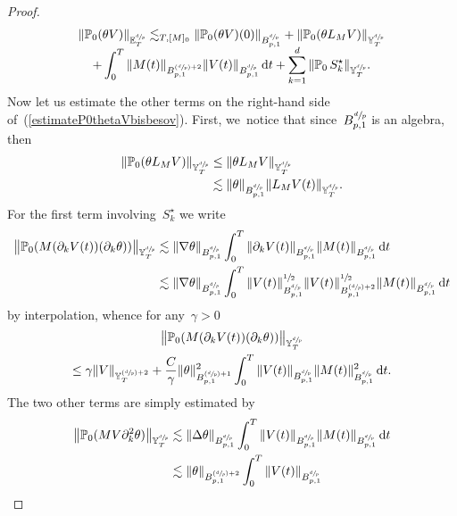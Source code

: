 \documentclass[10pt]{amsart}
\newcommand{\Psfrac}[2]{(\sfrac{#1}{#2})}
\theoremstyle{definition}
\newcommand\dd{\mathrm{d}}
\begin{document}
\begin{proof}
\begin{multline}\label{estimateP0thetaVbisbesov}
\|\mathbb{P}_0(\theta V)\|_{{\mathbb E}^{\sfrac dp}_T} \lesssim_{T,[M]_0} \|\mathbb{P}_0(\theta V)(0)\|_{B^{\sfrac dp}_{p,1}}
+ \| \mathbb{P}_0(\theta L_{M }V)\|_{{\mathbb Y}^{\sfrac dp}_T} \\[-5pt]
+ \int_0^T
\| M(t)\|_{ B^{\Psfrac dp+2}_{p,1}} \|V(t)\|_{ B^{\sfrac dp}_{p,1}}\, \dd t+ \sum_{k=1}^d \|\mathbb{P}_0\,S_k^\star\|_{{\mathbb Y}^{\sfrac dp}_T}.
\end{multline}
Now let us estimate the other terms on the right-hand side of~(\ref{estimateP0thetaVbisbesov}). First, we~notice that since~$B^{\sfrac dp}_{p,1}$ is an algebra, then
\[
\begin{aligned}
\| \mathbb{P}_0(\theta L_{M }V)\| _{{\mathbb Y}^{\sfrac dp}_T} & \leq \| \theta L_{M }V\| _{{\mathbb Y}^{\sfrac dp}_T} \\
&\lesssim \|\theta \|_{ B^{\sfrac dp}_{p,1}} \| L_{M }V(t) \| _{{\mathbb Y}^{\sfrac dp}_T}.
\end{aligned}
\]
For the first term involving~$S^\star_k$ we write
\[
\begin{aligned}
\big \| \mathbb{P}_0(M (\partial_k V(t))(\partial_k\theta)) \big\|_{ {\mathbb Y}^{\sfrac dp}_T } & \lesssim \|\nabla \theta\|_{ B^{\sfrac dp}_{p,1} } \int_0^T \| \partial_k V(t)\|_{B^{\sfrac dp}_{p,1}}
\|M(t)\| _{ B^{\sfrac dp}_{p,1}} \, \dd t \\
& \lesssim \|\nabla \theta\|_{ B^{\sfrac dp}_{p,1} } \int_0^T \| V(t)\|_{B^{\sfrac dp}_{p,1}}^{\sfrac12} \| V(t)\|_{B^{\Psfrac dp+2}_{p,1}}^{\sfrac12}
\|M(t)\| _{ B^{\sfrac dp}_{p,1}} \, \dd t
\end{aligned}
\]
by interpolation, whence for any~$
\gamma>0$
\begin{multline*}
\big \| \mathbb{P}_0(M (\partial_k V(t))(\partial_k\theta)) \big\|_{ {\mathbb Y}^{\sfrac dp}_T }\\
\leq \gamma \| V\|_{{\mathbb Y}^{\Psfrac dp+2}_T} + \frac C\gamma \| \theta\|^2_{ B^{\Psfrac dp+1}_{p,1} } \int_0^T \| V(t)\|_{B^{\sfrac dp}_{p,1}}\|M(t)\|^2 _{ B^{\sfrac dp}_{p,1}} \, \dd t.
\end{multline*}
The two other terms are simply estimated by
\[
\begin{aligned}
\big \| \mathbb{P}_0(MV \partial_k^2 \theta) \big\|_{{\mathbb Y}^{\sfrac dp}_T } & \lesssim \|\Delta \theta\|_{ B^{\sfrac dp}_{p,1} } \int_0^T \| V(t)\|_{B^{\sfrac dp}_{p,1}}
\|M(t)\| _{ B^{\sfrac dp}_{p,1}} \, \dd t \\
& \lesssim \| \theta\|_{ B^{\Psfrac dp+2}_{p,1} } \int_0^T \| V(t)\|_{B^{\sfrac dp}_{p,1}}

\end{aligned}\]
\end{proof}
\end{document}
